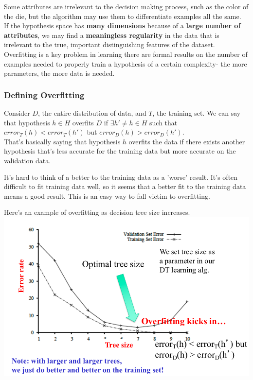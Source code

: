 \documentclass[english, 10pt]{article}
\begin{document}
Some attributes are irrelevant to the decision making process, such as the color of the die, but the algorithm may use them to differentiate examples all the same.\\

If the hypothesis space has \textbf{many dimensions} because of a \textbf{large number of attributes}, we may find a \textbf{meaningless regularity} in the data that is irrelevant to the true, important distinguishing features of the dataset.\\

Overfitting is a key problem in learning there are formal results on the number of examples needed to properly train a hypothesis of a certain complexity- the more parameters, the more data is needed.

\subsubsection{Defining Overfitting}

Consider $D$, the entire distribution of data, and $T$, the training set. We can say that hypothesis $h \in H$ overfits $D$ if $\exists h' \neq h \in H$ such that $error_T(h) < error_T(h')$ but $error_D(h) > error_D(h')$.\\

That's basically saying that hypothesis $h$ overfits the data if there exists another hypothesis that's less accurate for the training data but more accurate on the validation data.\\

\begin{tcolorbox}[title=Aside: Fitting Training Data vs. Validation Data,colframe=black,colback=white,arc=0pt,fonttitle=\bfseries]

It's hard to think of a better to the training data as a 'worse' result. It's often difficult to fit training data well, so it seems that a better fit to the training data means a good result. This is an easy way to fall victim to overfitting.

\end{tcolorbox}

\hfill \break Here's an example of overfitting as decision tree size increases.\\

\includegraphics[scale=0.5]{img/overfitting.png} 
\end{document}
